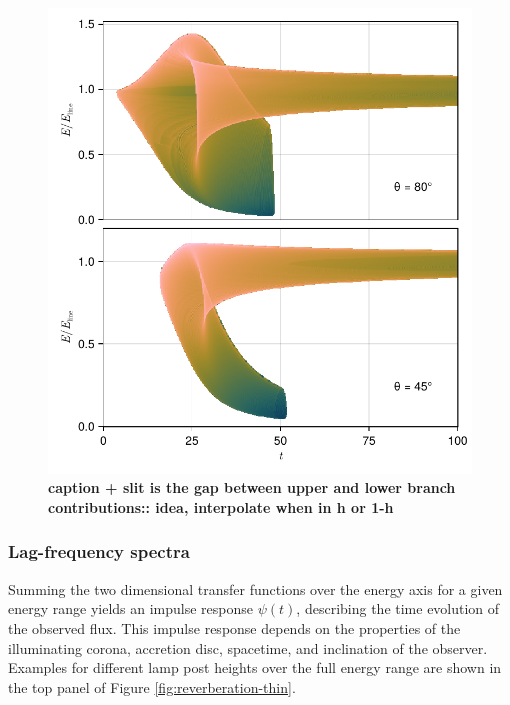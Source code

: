 \documentclass[fleqn,usenatbib]{mnras}
\newcommand{\todo}[1]{{\bf \color{red} #1}}
\begin{document}
\begin{figure}
	\centering
	\includegraphics[width=0.97\linewidth]{figures/transfer-functions.2d.pdf}
	\caption{\todo{caption + slit is the gap between upper and lower branch contributions:: idea, interpolate when in h or 1-h}}
	\label{fig:lag-frequency-transfer-functions}
\end{figure}

\subsubsection{Lag-frequency spectra}

Summing the two dimensional transfer functions over the energy axis for a given energy range yields an impulse response $\psi(t)$, describing the time evolution of the observed flux. This impulse response depends on the properties of the illuminating corona, accretion disc, spacetime, and inclination of the observer. Examples for different lamp post heights over the full energy range are shown in the top panel of Figure \ref{fig:reverberation-thin}.
\end{document}
